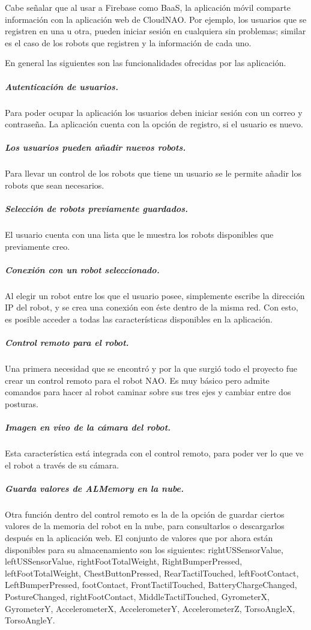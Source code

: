 Cabe señalar que al usar a Firebase como BaaS, la aplicación móvil
comparte información con la aplicación web de CloudNAO. Por ejemplo, los
usuarios que se registren en una u otra, pueden iniciar sesión en cualquiera
sin problemas; similar es el caso de los robots que registren y la información
de cada uno.

En general las siguientes son las funcionalidades ofrecidas por las aplicación.


\subparagraph{Autenticación de usuarios.}
\label{\detokenize{users_docs:autenticacion-de-usuarios}}
Para poder ocupar la aplicación los usuarios deben iniciar sesión con un correo
y contraseña. La aplicación cuenta con la opción de registro, si el usuario
es nuevo.


\subparagraph{Los usuarios pueden añadir nuevos robots.}
\label{\detokenize{users_docs:los-usuarios-pueden-anadir-nuevos-robots}}
Para llevar un control de los robots que tiene un usuario se le permite añadir
los robots que sean necesarios.


\subparagraph{Selección de robots previamente guardados.}
\label{\detokenize{users_docs:seleccion-de-robots-previamente-guardados}}
El usuario cuenta con una lista que le muestra los robots disponibles
que previamente creo.


\subparagraph{Conexión con un robot seleccionado.}
\label{\detokenize{users_docs:conexion-con-un-robot-seleccionado}}
Al elegir un robot entre los que el usuario posee, simplemente escribe la
dirección IP del robot, y se crea una conexión eon éste dentro de la misma
red. Con esto, es posible acceder a todas las características disponibles en la
aplicación.


\subparagraph{Control remoto para el robot.}
\label{\detokenize{users_docs:control-remoto-para-el-robot}}
Una primera necesidad que se encontró y por la que surgió todo el proyecto
fue crear un control remoto para el robot NAO. Es muy básico pero admite
comandos para hacer al robot caminar sobre sus tres ejes y cambiar entre dos
posturas.


\subparagraph{Imagen en vivo de la cámara del robot.}
\label{\detokenize{users_docs:imagen-en-vivo-de-la-camara-del-robot}}
Esta característica está integrada con el control remoto, para poder ver lo
que ve el robot a través de su cámara.


\subparagraph{Guarda valores de ALMemory en la nube.}
\label{\detokenize{users_docs:guarda-valores-de-almemory-en-la-nube}}
Otra función dentro del control remoto es la de la opción de guardar ciertos
valores de la memoria del robot en la nube, para consultarlos o descargarlos
después en la aplicación web. El conjunto de valores que por ahora
están disponibles para su almacenamiento son los siguientes:
rightUSSensorValue, leftUSSensorValue, rightFootTotalWeight, RightBumperPressed, leftFootTotalWeight, ChestButtonPressed, RearTactilTouched, leftFootContact, LeftBumperPressed, footContact, FrontTactilTouched, BatteryChargeChanged, PostureChanged, rightFootContact, MiddleTactilTouched, GyrometerX, GyrometerY, AccelerometerX, AccelerometerY, AccelerometerZ, TorsoAngleX, TorsoAngleY.


